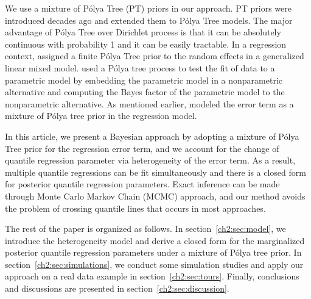 \documentclass[12pt]{article}
\newcommand{\polya}{P\'{o}lya}
\begin{document}
We use a mixture of \polya{} Tree (PT) priors in our approach. PT
priors were introduced decades ago \citep{freedman1963, fabius1964,
  ferguson1974} and \citet{lavine1992, lavine1994} extended them to
\polya{} Tree models. The major advantage of \polya{} Tree over
Dirichlet process is that it can be absolutely continuous with
probability 1 and it can be easily tractable. In a regression context,
\citet{walker1997, walker1999} assigned a finite \polya{} Tree prior
to the random effects in a generalized linear mixed
model. \citet{berger2001} used
a \polya{} tree process to test the fit of
data to a parametric model by embedding the parametric model in a
nonparametric alternative and computing the Bayes factor of the
parametric model to the nonparametric alternative.
As mentioned earlier, \citet{hanson2002} modeled the error term as a mixture of \polya{} tree prior in the regression model.


In this article, we present a Bayesian approach by adopting a mixture
of \polya{} Tree prior for the regression error term, and we account
for the change of quantile regression parameter via heterogeneity of
the error term.
As a result, multiple quantile regressions can be fit simultaneously and there is a closed form for posterior quantile regression parameters.
Exact inference can be made through Monte Carlo Markov Chain (MCMC) approach, and our method avoids the problem of crossing quantile lines that occurs in most approaches.

The rest of the paper is organized as follows. In
section~\ref{ch2:sec:model}, we introduce the heterogeneity model and
derive a closed form for the marginalized posterior quantile regression
parameters under a mixture of \polya{} tree prior.  In
section~\ref{ch2:sec:simulations}, we conduct some simulation studies and
apply our approach on a real data example in
section~\ref{ch2:sec:tours}. Finally, conclusions and discussions are
presented in section~\ref{ch2:sec:discussion}.
\end{document}
